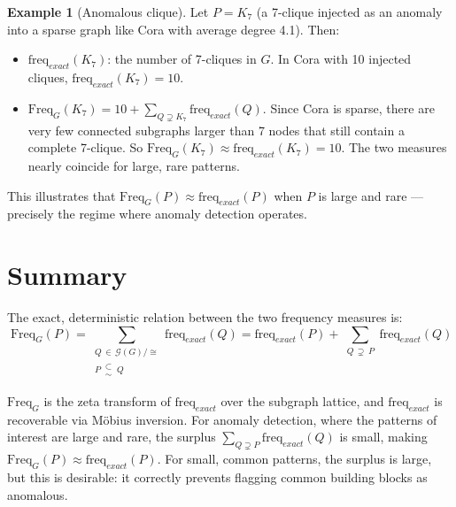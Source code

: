 \documentclass[11pt,a4paper]{article}
\theoremstyle{plain}
\theoremstyle{definition}
\newtheorem{example}{Example}
\newcommand{\Freq}{\mathrm{Freq}}
\newcommand{\freq}{\mathrm{freq}}
\newcommand{\GG}{\mathcal{G}}
\newcommand\subsetsim{\mathrel{\substack{
  \textstyle\subset\\[-0.2ex]\textstyle\sim}}}
\begin{document}
\begin{example}[Anomalous clique]
Let $P = K_7$ (a 7-clique injected as an anomaly into a sparse graph like Cora with average degree 4.1). Then:
\begin{itemize}
    \item $\freq_{exact}(K_7)$: the number of 7-cliques in $G$. In Cora with 10 injected cliques, $\freq_{exact}(K_7) = 10$.
    \item $\Freq_G(K_7) = 10 + \sum_{Q \supsetneq K_7} \freq_{exact}(Q)$. Since Cora is sparse, there are very few connected subgraphs larger than 7 nodes that still contain a complete 7-clique. So $\Freq_G(K_7) \approx \freq_{exact}(K_7) = 10$. The two measures nearly coincide for large, rare patterns.
\end{itemize}
This illustrates that $\Freq_G(P) \approx \freq_{exact}(P)$ when $P$ is large and rare --- precisely the regime where anomaly detection operates.
\end{example}

\section{Summary}

The exact, deterministic relation between the two frequency measures is:
\[
\boxed{\;\Freq_G(P) = \sum_{\substack{Q \,\in\, \GG(G)/{\cong} \\[2pt] P \,\subsetsim\, Q}} \freq_{exact}(Q) = \freq_{exact}(P) + \sum_{\substack{Q \,\supsetneq\, P}} \freq_{exact}(Q)\;}
\]

$\Freq_G$ is the zeta transform of $\freq_{exact}$ over the subgraph lattice, and $\freq_{exact}$ is recoverable via M\"obius inversion. For anomaly detection, where the patterns of interest are large and rare, the surplus $\sum_{Q \supsetneq P} \freq_{exact}(Q)$ is small, making $\Freq_G(P) \approx \freq_{exact}(P)$. For small, common patterns, the surplus is large, but this is desirable: it correctly prevents flagging common building blocks as anomalous.
\end{document}
